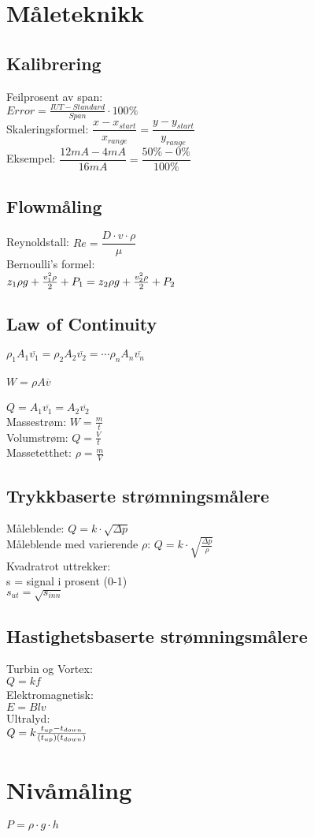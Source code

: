 \section{Måleteknikk}
\subsection*{Kalibrering}
Feilprosent av span:\\
$Error=\frac {IUT-Standard}{Span} \cdot 100\% $\\
\vskip 2.5pt 
Skaleringsformel:
\vskip 2.5pt 
$\dfrac{x-x_{start}}{x_{range}}=\dfrac{y-y_{start}}{y_{range}}$\\
Eksempel: $\dfrac{12mA-4mA}{16mA}=\dfrac{50\%-0\%}{100\%}$
\subsection*{Flowmåling}
\vskip 2.5pt 
\vskip 2.5pt 
\vskip 2.5pt 
Reynoldstall: $Re=\dfrac {D \cdot v \cdot \rho}{\mu}$\\
\vskip 2.5pt 
Bernoulli's formel:\\
$z_1 \rho g + {v_1^2 \rho \over 2} + P_1 = z_2 \rho g + {v_2^2 \rho \over 2} + P_2$\\
\vskip 2.5pt 
\subsection*{Law of Continuity}
$\rho_1 A_1 \overline{v_1} = \rho_2 A_2 \overline{v_2} = \cdots \rho_n A_n \overline{v_n}$\\
\\
$W = \rho A \overline{v}$\\\\
$Q=A_1 \overline{v_1} = A_2 \overline{v_2}$\\

Massestrøm: $W=\frac{m}{t}$\\
\vskip 2.5pt 
Volumstrøm: $Q=\frac{V}{t}$\\
\vskip 2.5pt 
Massetetthet: $\rho=\frac{m}{V}$\\
\vskip 2.5pt 
\subsection*{Trykkbaserte strømningsmålere}
Måleblende: $Q=k\cdot \sqrt{\Delta p}$\\
\vskip 2.5pt 
Måleblende med varierende $\rho$: $Q=k\cdot \sqrt{\frac{\Delta p}{\rho}}$\\
\vskip 2.5pt
Kvadratrot uttrekker:\\
s = signal i prosent (0-1)\\
$s_{ut}=\sqrt{s_{inn}}$\\
\subsection*{Hastighetsbaserte strømningsmålere}
Turbin og Vortex:\\
$Q=kf$\\
Elektromagnetisk:\\
$E=Blv$\\
Ultralyd:\\
$Q = k {t_{up} - t_{down} \over (t_{up})(t_{down})}$\\
 
\section{Nivåmåling}

$P = \rho \cdot g \cdot h $\\
